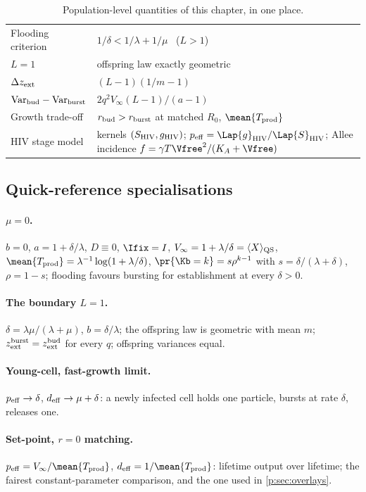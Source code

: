 \begin{table}[htbp]
\begin{tabular}{@{}p{}p{}@{}}
Flooding criterion & $1/\delta<1/\lambda+1/\mu$ \ ($L>1$) \\
$L=1$ & offspring law exactly geometric \\
$\Delta z_{\rm ext}$ & $(L-1)(1/m-1)$ \\
$\mathrm{Var}_{\rm bud}-\mathrm{Var}_{\rm burst}$ & $2q^2V_\infty(L-1)/(a-1)$ \\
Growth trade-off & $r_{\rm bud}>r_{\rm burst}$ at matched $R_0$, $\mean{T_{\rm prod}}$ \\
HIV stage model & kernels $(S_{\rm HIV},g_{\rm HIV})$; $p_{\rm eff}=\Lap{g}_{\rm HIV}/\Lap{S}_{\rm HIV}$; Allee incidence $f=\gamma T\Vfree^2/(K_A+\Vfree)$ \\
\bottomrule
\end{tabular}
\caption{Population-level quantities of this chapter, in one place.}
\label{p:tab:formulae}
\end{table}
\FloatBarrier

\subsection*{Quick-reference specialisations}

\paragraph{$\mu=0$.} $b=0$, $a=1+\delta/\lambda$, $D\equiv0$, $\Ifix=I$,
$V_\infty=1+\lambda/\delta=\langle X\rangle_{\rm QS}$,
$\mean{T_{\rm prod}}=\lambda^{-1}\log(1+\lambda/\delta)$,
$\pr{\Kb=k}=s\rho^{k-1}$ with $s=\delta/(\lambda+\delta)$, $\rho=1-s$;
flooding favours bursting for establishment at every $\delta>0$.

\paragraph{The boundary $L=1$.} $\delta=\lambda\mu/(\lambda+\mu)$,
$b=\delta/\lambda$; the offspring law is geometric with mean $m$;
$z_{\rm ext}^{\rm burst}=z_{\rm ext}^{\rm bud}$ for every $q$; offspring
variances equal.

\paragraph{Young-cell, fast-growth limit.} $p_{\rm eff}\to\delta$,
$d_{\rm eff}\to\mu+\delta$: a newly infected cell holds one particle, bursts
at rate $\delta$, releases one.

\paragraph{Set-point, $r=0$ matching.}
$p_{\rm eff}=V_\infty/\mean{T_{\rm prod}}$,
$d_{\rm eff}=1/\mean{T_{\rm prod}}$: lifetime output over lifetime; the
fairest constant-parameter comparison, and the one used in
\cref{p:sec:overlays}.

\FloatBarrier
